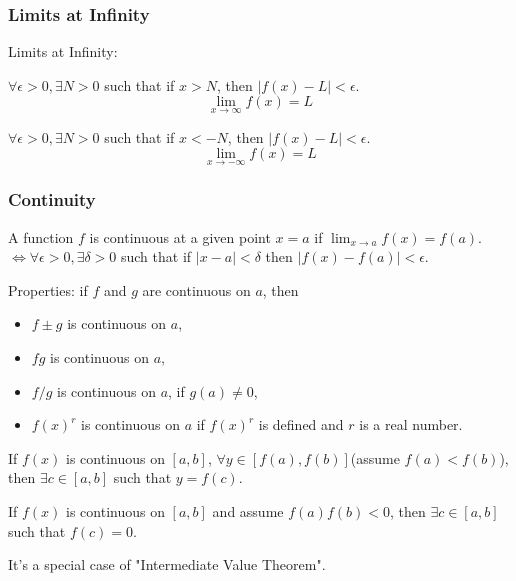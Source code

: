 \subsubsection{Limits at Infinity}

\begin{definition}Limits at Infinity:

    $\forall \epsilon > 0, \exists N > 0$ such that if $x > N$, then $|f(x) - L|< \epsilon$.
    \begin{equation*}
        \lim_{x \to \infty} f(x) = L
    \end{equation*}

    $\forall \epsilon > 0, \exists N > 0$ such that if $x < -N$, then $|f(x) - L|< \epsilon$.
    \begin{equation*}
        \lim_{x \to -\infty} f(x) = L
    \end{equation*}
\end{definition}

\subsubsection{Continuity}

\begin{definition}
    A function $f$ is continuous at a given point $x=a$ if $\lim_{x \to a} f(x) = f(a)$. $\iff \forall \epsilon > 0, \exists \delta > 0$ such that if $|x-a|<\delta$ then $|f(x) - f(a)| < \epsilon$.
\end{definition}

Properties: if $f$ and $g$ are continuous on $a$, then
\begin{itemize}
    \item $f \pm g$ is continuous on $a$,
    \item $fg$ is continuous on $a$,
    \item $f / g$ is continuous on $a$, if $g(a) \neq 0$,
    \item $f(x)^{r}$ is continuous on $a$ if $f(x)^{r}$ is defined and $r$ is a real number.
\end{itemize}


\begin{theorem}
    If $f(x)$ is continuous on $[a,b]$, $\forall y \in [f(a), f(b)]$(assume $f(a) < f(b)$), then $\exists c \in [a,b]$ such that $y=f(c)$.
\end{theorem}

\begin{theorem}
    If $f(x)$ is continuous on $[a,b]$ and assume $f(a)f(b)<0$, then $\exists c \in [a,b]$ such that $f(c) = 0$.
    \begin{remark*}
        It's a special case of "Intermediate Value Theorem".
    \end{remark*}
\end{theorem}

